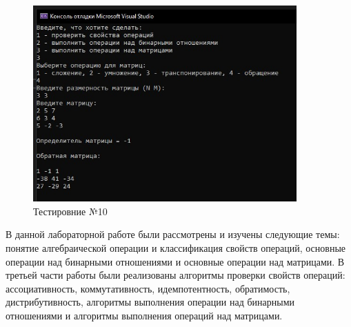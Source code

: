 \documentclass[bachelor, och, labwork]{shiza}
\begin{document}
\begin{figure}[H]
	\centering
	\includegraphics[width=0.9\textwidth]{test_10}
	\caption{Тестировние №10}
	\label{fig:test_10}
\end{figure}
	\newpage
	\conclusion %
	
	В данной лабораторной работе были рассмотрены и изучены следующие темы: понятие алгебраической операции и классификация свойств операций, основные операции над бинарными отношениями и основные операции над матрицами. В третьей части работы были реализованы алгоритмы проверки свойств операций: ассоциативность, коммутативность, идемпотентность, обратимость, дистрибутивность, алгоритмы выполнения операции над бинарными отношениями и алгоритмы выполнения операций над матрицами.  
	  
	
	
	
\end{document}
